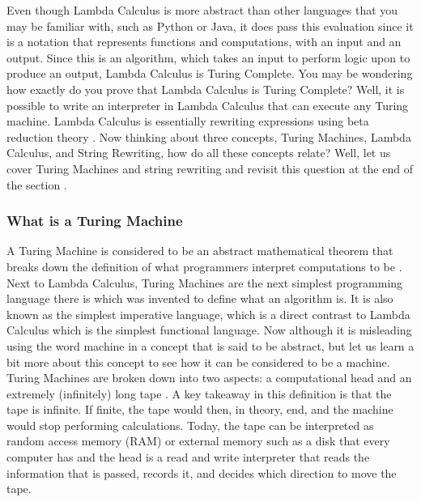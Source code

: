 \documentclass{article}
\begin{document}
\medskip\noindent
Even though Lambda Calculus is more abstract than other languages that you may be familiar with, such as Python or Java, it does pass this evaluation since it is a notation that represents functions and computations, with an input and an output. Since this is an algorithm, which takes an input to perform logic upon to produce an output, Lambda Calculus is Turing Complete. You may be wondering how exactly do you prove that Lambda Calculus is Turing Complete? Well, it is possible to write an interpreter in Lambda Calculus that can execute any Turing machine. Lambda Calculus is essentially rewriting expressions using beta reduction theory \cite{PL}. Now thinking about three concepts, Turing Machines, Lambda Calculus, and String Rewriting, how do all these concepts relate? Well, let us cover Turing Machines and string rewriting and revisit this question at the end of the section \cite{Turing Completeness}.

\subsubsection{What is a Turing Machine}
 A Turing Machine is considered to be an abstract mathematical theorem that breaks down the definition of what programmers interpret computations to be \cite{Turing Completeness}. Next to Lambda Calculus, Turing Machines are the next simplest programming language there is which was invented to define what an algorithm is. It is also known as the simplest imperative language, which is a direct contrast to Lambda Calculus which is the simplest functional language. Now although it is misleading using the word machine in a concept that is said to be abstract, but let us learn a bit more about this concept to see how it can be considered to be a machine. Turing Machines are broken down into two aspects: a computational head and an extremely (infinitely) long tape \cite{Turing Completeness}. A key takeaway in this definition is that the tape is infinite. If finite, the tape would then, in theory, end, and the machine would stop performing calculations. Today, the tape can be interpreted as random access memory (RAM) or external memory such as a disk that every computer has and the head is a read and write interpreter that reads the information that is passed, records it, and decides which direction to move the tape. 
 
\end{document}
